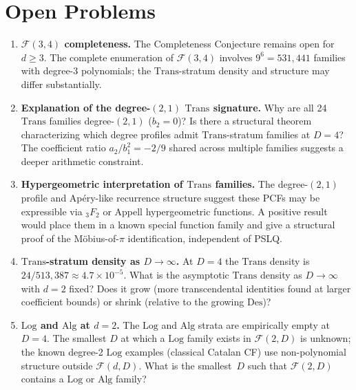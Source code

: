 \documentclass[12pt, reqno]{amsart}
\theoremstyle{definition}
\theoremstyle{remark}
\newcommand{\Log}{\mathrm{Log}}
\newcommand{\Alg}{\mathrm{Alg}}
\newcommand{\Trans}{\mathrm{Trans}}
\newcommand{\Des}{\mathrm{Des}}
\begin{document}
\section{Open Problems}\label{sec:open}

\begin{enumerate}[\bfseries(P1)]
\item \textbf{$\mathcal{F}(3,4)$ completeness.}
The Completeness Conjecture remains open for $d\ge 3$.
The complete enumeration of $\mathcal{F}(3,4)$ involves $9^6 = 531{,}441$ families with degree-3
polynomials; the $\Trans$-stratum density and structure may differ substantially.

\item \textbf{Explanation of the degree-$(2,1)$ $\Trans$ signature.}
Why are all 24 $\Trans$
families degree-$(2,1)$ ($b_2 = 0$)? Is there a structural theorem characterizing
which degree profiles admit $\Trans$-stratum families at $D=4$? The coefficient
ratio $a_2/b_1^2 = -2/9$ shared across multiple families suggests a deeper
arithmetic constraint.

\item \textbf{Hypergeometric interpretation of $\Trans$ families.}
The degree-$(2,1)$
profile and Ap\'ery-like recurrence structure suggest these PCFs may be
expressible via ${}_3F_2$ or Appell hypergeometric functions. A positive result
would place them in a known special function family and give a structural
proof of the M\"obius-of-$\pi$ identification, independent of PSLQ.

\item \textbf{$\Trans$-stratum density as $D \to \infty$.}
At $D=4$ the $\Trans$ density is
$24/513{,}387 \approx 4.7 \times 10^{-5}$. What is the asymptotic $\Trans$ density as $D \to \infty$
with $d=2$ fixed? Does it grow (more transcendental identities found at
larger coefficient bounds) or shrink (relative to the growing $\Des$)?

\item \textbf{$\Log$ and $\Alg$ at $d=2$.}
The $\Log$ and $\Alg$ strata are empirically empty
at $D=4$. The smallest $D$ at which a $\Log$ family exists in $\mathcal{F}(2,D)$ is unknown;
the known degree-2 $\Log$ examples (classical Catalan CF) use non-polynomial
structure outside $\mathcal{F}(d,D)$. What is the smallest~$D$ such that $\mathcal{F}(2,D)$ contains
a $\Log$ or $\Alg$ family?


\end{enumerate}
\end{document}
